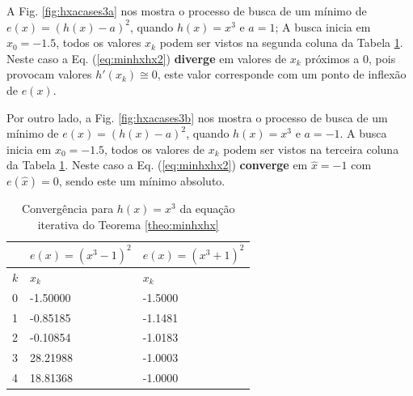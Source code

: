 \begin{example}\label{ex:minhxhx3}
 A Fig. \ref{fig:hxacases3a} nos mostra o processo de busca de um mínimo
 de $e(x)=(h(x)-a)^2$, quando $h(x)=x^3$ e $a=1$; A busca inicia em $x_0=-1.5$,
 todos os valores $x_{k}$ podem ser vistos na segunda coluna da
Tabela \ref{tab:hxacases3}. Neste caso a Eq. (\ref{eq:minhxhx2}) \textbf{diverge} em 
valores de $x_{k}$ próximos a $0$, pois provocam valores  $h'(x_{k})\cong 0$,
este valor corresponde com um ponto de inflexão de $e(x)$.

 Por outro lado, a Fig. \ref{fig:hxacases3b} nos mostra o processo de busca de um mínimo
 de $e(x)=(h(x)-a)^2$, quando $h(x)=x^3$ e $a=-1$. A busca inicia em $x_0=-1.5$,
 todos os valores de $x_{k}$ podem ser vistos na terceira coluna da
Tabela \ref{tab:hxacases3}. Neste caso a Eq. (\ref{eq:minhxhx2}) \textbf{converge} 
em $\hat{x}=-1$ com $e(\hat{x})=0$, sendo este um mínimo absoluto.
\begin{table}[!h]
\centering
\begin{tabular}{|l|l|l|}
\hline
~&$e(x)=(x^3-1)^2$ & $e(x)=(x^3+1)^2$ \\ \hline
$k$&$x_k$  & $x_k$ \\ \hline
0&-1.50000  & -1.5000   \\
1&-0.85185  & -1.1481   \\
2&-0.10854  & -1.0183   \\
3&28.21988  & -1.0003   \\
4&18.81368  & -1.0000   \\  \hline
\end{tabular}
\caption{Convergência para $h(x)=x^3$ da equação iterativa do Teorema \ref{theo:minhxhx}}
\label{tab:hxacases3}
\end{table}
\end{example}

